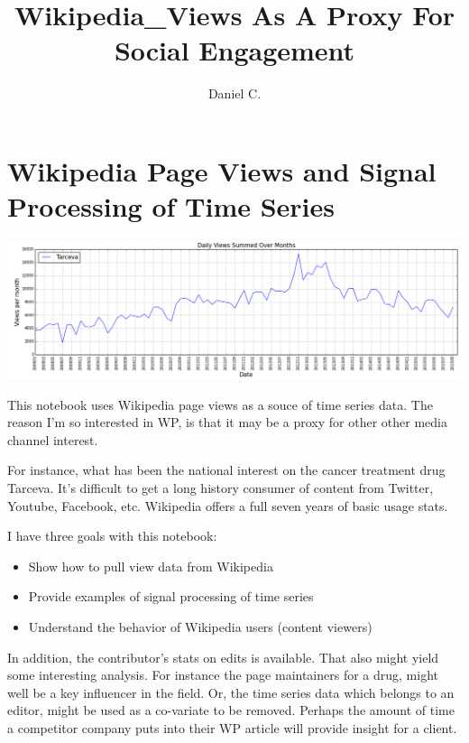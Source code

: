 \documentclass{article}
\title{Wikipedia\_Views As A Proxy For Social Engagement}
\author{Daniel C.}
\begin{document}
    \maketitle




    \section{Wikipedia Page Views and Signal Processing of Time
Series}\label{wikidpedia-page-views-and-signal-processing-of-time-series}

\includegraphics[scale=0.3]{tarceva_plot.png}

This notebook uses Wikipedia page views as a souce of time series data.
The reason I'm so interested in WP, is that it may be a proxy for other
other media channel interest.

For instance, what has been the national interest on the cancer
treatment drug Tarceva. It's difficult to get a long history consumer of
content from Twitter, Youtube, Facebook, etc. Wikipedia offers a full
seven years of basic usage stats.

I have three goals with this notebook:

\begin{itemize}
\itemsep1pt\parskip0pt
\item
  Show how to pull view data from Wikipedia
\item
  Provide examples of signal processing of time series
\item
  Understand the behavior of Wikipedia users (content viewers)
\end{itemize}

In addition, the contributor's stats on edits is available. That also
might yield some interesting analysis. For instance the page maintainers
for a drug, might well be a key influencer in the field. Or, the time
series data which belongs to an editor, might be used as a co-variate to
be removed. Perhaps the amount of time a competitor company puts into
their WP article will provide insight for a client.
\end{document}
